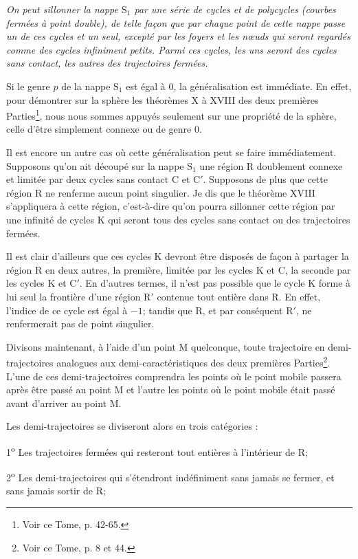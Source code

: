 \documentclass[11pt]{article}
\begin{document}
\emph{On peut sillonner la nappe $\mathrm{S}_1$ par une série de cycles et de polycycles (courbes fermées à point double), de telle façon que par chaque point de cette nappe passe un de ces cycles et un seul, excepté par les foyers et les nœuds qui seront regardés comme des cycles infiniment petits. Parmi ces cycles, les uns seront des cycles sans contact, les autres des trajectoires fermées.}

Si le genre $p$ de la nappe $\mathrm{S}_1$ est égal à 0, la généralisation est immédiate. En effet, pour démontrer sur la sphère les théorèmes X à XVIII des deux premières Parties\footnote{Voir ce Tome, p. 42-65.}, nous nous sommes appuyés seulement sur une propriété de la sphère, celle d’être simplement connexe ou de genre 0.

Il est encore un autre cas où cette généralisation peut se faire immédiatement. Supposons qu’on ait découpé sur la nappe $\mathrm{S}_1$ une région R doublement connexe et limitée par deux cycles sans contact C et C$'$. Supposons de plus que cette région R ne renferme aucun point singulier. Je dis que le théorème XVIII s’appliquera à cette région, c’est-à-dire qu’on pourra sillonner cette région par une infinité de cycles K qui seront tous des cycles sans contact ou des trajectoires fermées.

Il est clair d’ailleurs que ces cycles K devront être disposés de façon à partager la région R en deux autres, la première, limitée par les cycles K et C, la seconde par les cycles K et C$'$. En d’autres termes, il n’est pas possible que le cycle K forme à lui seul la frontière d’une région R$'$ contenue tout entière dans R. En effet, l’indice de ce cycle est égal à $-1$; tandis que R, et par conséquent R$'$, ne renfermerait pas de point singulier.

Divisons maintenant, à l’aide d’un point M quelconque, toute trajectoire en demi-trajectoires analogues aux demi-caractéristiques des deux premières Parties\footnote{Voir ce Tome, p. 8 et 44.}. L’une de ces demi-trajectoires comprendra les points où le point mobile passera après être passé au point M et l’autre les points où le point mobile était passé avant d’arriver au point M.

Les demi-trajectoires se diviseront alors en trois catégories :

1\textsuperscript{o} Les trajectoires fermées qui resteront tout entières à l’intérieur de R;

2\textsuperscript{o} Les demi-trajectoires qui s’étendront indéfiniment sans jamais se fermer, et sans jamais sortir de R;
\end{document}
